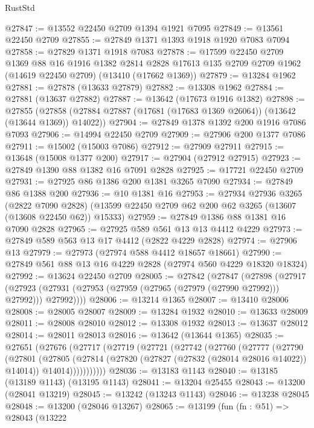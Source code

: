 \begin{lexlean}{RustStd}
\begin{coremodule}
@27847 := @13552 @22450 @2709 @1394 @1921 @7095
@27849 := @13561 @22450 @2709
@27855 := @27849 @1371 @1393 @1918 @1920 @7083 @7094
@27858 := @27829 @1371 @1918 @7083
@27878 := @17599
    @22450
    @2709
    @1369
    @88
    @16
    @1916
    @1382
    @2814
    @2828
    @17613
    @135
    @2709
    @2709
    @1962
    (@14619 @22450 @2709)
    (@13410 (@17662 @1369))
@27879 := @13284 @1962
@27881 := @27878 (@13633 @27879)
@27882 := @13308 @1962
@27884 := @27881 (@13637 @27882)
@27887 := @13642 (@17673 @1916 @1382)
@27898 := @27855
    (@27858 (@27884 @27887 (@17681 (@17683 @1369 @26064)) (@13642 (@13644 @1369)) @14022))
@27904 := @27849 @1378 @1392 @200 @1916 @7086 @7093
@27906 := @14994 @22450 @2709
@27909 := @27906 @200 @1377 @7086
@27911 := @15002 (@15003 @7086)
@27912 := @27909 @27911
@27915 := @13648 (@15008 @1377 @200)
@27917 := @27904 (@27912 @27915)
@27923 := @27849 @1390 @88 @1382 @16 @7091 @2828
@27925 := @17721 @22450 @2709
@27931 := @27925 @86 @1386 @200 @1381 @3265 @7090
@27934 := @27849 @86 @1388 @200
@27936 := @10 @1381 @16
@27953 := @27934
    @27936
    @3265
    (@2822 @7090 @2828)
    (@13599 @22450 @2709 @62 @200 @62 @3265 (@13607 (@13608 @22450 @62)) @15333)
@27959 := @27849 @1386 @88 @1381 @16 @7090 @2828
@27965 := @27925 @589 @561 @13 @13 @4412 @4229
@27973 := @27849 @589 @563 @13 @17 @4412 (@2822 @4229 @2828)
@27974 := @27906 @13
@27979 := @27973 (@27974 @588 @4412 @18657 @18661)
@27990 := @27849 @561 @88 @13 @16 @4229 @2828 (@27974 @560 @4229 @18320 @18324)
@27992 := @13624 @22450 @2709
@28005 := @27842
    (@27847
      (@27898
        (@27917
          (@27923 (@27931 (@27953 (@27959 (@27965 (@27979 (@27990 @27992))) @27992))) @27992))))
@28006 := @13214 @1365
@28007 := @13410 @28006
@28008 := @28005 @28007
@28009 := @13284 @1932
@28010 := @13633 @28009
@28011 := @28008 @28010
@28012 := @13308 @1932
@28013 := @13637 @28012
@28014 := @28011 @28013
@28016 := @13642 (@13644 @1365)
@28035 := @27651
    (@27676
      (@27717
        (@27719
          (@27721
            (@27742
              (@27760
                (@27777
                  (@27790
                    (@27801
                      (@27805
                        (@27814
                          (@27820 (@27827 (@27832 (@28014 @28016 @14022)) @14014))
                          @14014)))))))))))
@28036 := @13183 @1143
@28040 := @13185 (@13189 @1143) (@13195 @1143)
@28041 := @13204 @25455
@28043 := @13200 (@28041 @13219)
@28045 := @13242 (@13243 @1143)
@28046 := @13238 @28045
@28048 := @13200 (@28046 @13267)
@28065 := @13199
    (fun (fn : @51) =>
    @28043
      (@13222

\end{coremodule}
\end{lexlean}
